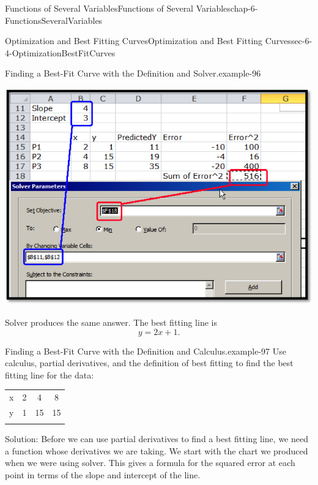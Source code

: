 \documentclass[oneside,10pt,]{book}
\numberwithin{equation}{section}
\newcommand{\hrulethin}  {\noalign{\hrule height 0.04em}}
\newcommand{\hrulethick} {\noalign{\hrule height 0.11em}}
\begin{document}
\begin{chapterptx}{Functions of Several Variables}{}{Functions of Several Variables}{}{}{chap-6-FunctionsSeveralVariables}
\begin{sectionptx}{Optimization and Best Fitting Curves}{}{Optimization and Best Fitting Curves}{}{}{sec-6-4-OptimizationBestFitCurves}
\begin{example}{Finding a Best-Fit Curve with the Definition and Solver.}{example-96}
\begin{sidebyside}{1}{0.1}{0.1}{0}
\begin{sbspanel}{0.8}
\includegraphics[width=1\linewidth]{images/sec-6-4-4.png}
\end{sbspanel}%
\end{sidebyside}%
\par
\hypertarget{p-2449}{}%
Solver produces the same answer.  The best fitting line is%
%
\begin{equation*}
y=2x+1.
\end{equation*}
\end{example}
\begin{example}{Finding a Best-Fit Curve with the Definition and Calculus.}{example-97}%
\hypertarget{p-2450}{}%
Use calculus, partial derivatives, and the definition of best fitting to find the best fitting line for the data:%
\begin{sidebyside}{1}{0}{0}{0}%
\begin{sbspanel}{1}%
{\centering%
\begin{tabular}{cccc}\hrulethick
x&2&4&8\tabularnewline\hrulethin
y&1&15&15\tabularnewline\hrulethin
\end{tabular}
\par}
\end{sbspanel}%
\end{sidebyside}%
\par
\hypertarget{p-2451}{}%
Solution:  Before we can use partial derivatives to find a best fitting line, we need a function whose derivatives we are taking.  We start with the chart we produced when we were using solver.  This gives a formula for the squared error at each point in terms of the slope and intercept of the line.%
\begin{sidebyside}{1}{0}{0}{0}%
\begin{sbspanel}{1}%

\end{sbspanel}
\end{sidebyside}
\end{example}
\end{sectionptx}
\end{chapterptx}
\end{document}
